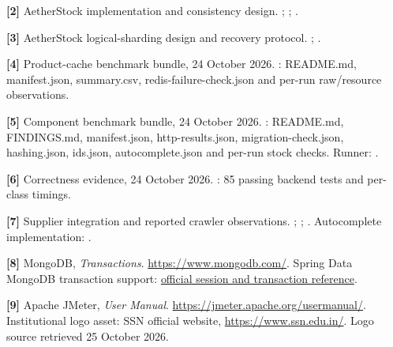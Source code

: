 \documentclass[11pt,a4paper]{article}
\newcommand{\ReportProjectName}{AetherStock}
\newenvironment{ReferenceText}{\begingroup\fontsize{9.7bp}{12.5bp}\selectfont}{\par\endgroup}
\begin{document}
\begin{ReferenceText}
\textbf{[2]} \ReportProjectName{} implementation and consistency design. ; ; .
\end{ReferenceText}

\begin{ReferenceText}
\textbf{[3]} \ReportProjectName{} logical-sharding design and recovery protocol. ; .
\end{ReferenceText}

\begin{ReferenceText}
\textbf{[4]} Product-cache benchmark bundle, 24 October 2026. : README.md, manifest.json, summary.csv, redis-failure-check.json and per-run raw/resource observations.
\end{ReferenceText}

\begin{ReferenceText}
\textbf{[5]} Component benchmark bundle, 24 October 2026. : README.md, FINDINGS.md, manifest.json, http-results.json, migration-check.json, hashing.json, ids.json, autocomplete.json and per-run stock checks. Runner: .
\end{ReferenceText}

\begin{ReferenceText}
\textbf{[6]} Correctness evidence, 24 October 2026. : 85 passing backend tests and per-class timings.
\end{ReferenceText}

\begin{ReferenceText}
\textbf{[7]} Supplier integration and reported crawler observations. ; ; . Autocomplete implementation: .
\end{ReferenceText}

\begin{ReferenceText}
\textbf{[8]} MongoDB, \textit{Transactions}. \href{https://www.mongodb.com/docs/manual/core/transactions/}{https://www.mongodb.com/}. Spring Data MongoDB transaction support: \href{https://docs.spring.io/spring-data/mongodb/reference/mongodb/client-session-transactions.html}{official session and transaction reference}.
\end{ReferenceText}

\begin{ReferenceText}
\textbf{[9]} Apache JMeter, \textit{User Manual}. \href{https://jmeter.apache.org/usermanual/}{https://jmeter.apache.org/usermanual/}. Institutional logo asset: SSN official website, \href{https://www.ssn.edu.in/}{https://www.ssn.edu.in/}. Logo source retrieved 25 October 2026.
\end{ReferenceText}
\end{document}
